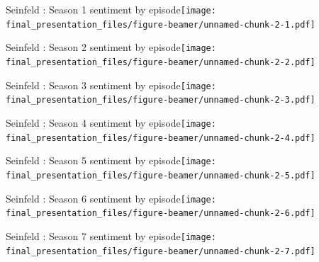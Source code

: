 \documentclass[
  ignorenonframetext,
]{beamer}
\begin{document}
\begin{frame}{Seinfeld : Season 1 sentiment by
episode\texttt{[image: final\_presentation\_files/figure-beamer/unnamed-chunk-2-1.pdf]}}
\protect\hypertarget{seinfeld-season-1-sentiment-by-episode}{}

\end{frame}

\begin{frame}{Seinfeld : Season 2 sentiment by
episode\texttt{[image: final\_presentation\_files/figure-beamer/unnamed-chunk-2-2.pdf]}}
\protect\hypertarget{seinfeld-season-2-sentiment-by-episode}{}

\end{frame}

\begin{frame}{Seinfeld : Season 3 sentiment by
episode\texttt{[image: final\_presentation\_files/figure-beamer/unnamed-chunk-2-3.pdf]}}
\protect\hypertarget{seinfeld-season-3-sentiment-by-episode}{}

\end{frame}

\begin{frame}{Seinfeld : Season 4 sentiment by
episode\texttt{[image: final\_presentation\_files/figure-beamer/unnamed-chunk-2-4.pdf]}}
\protect\hypertarget{seinfeld-season-4-sentiment-by-episode}{}

\end{frame}

\begin{frame}{Seinfeld : Season 5 sentiment by
episode\texttt{[image: final\_presentation\_files/figure-beamer/unnamed-chunk-2-5.pdf]}}
\protect\hypertarget{seinfeld-season-5-sentiment-by-episode}{}

\end{frame}

\begin{frame}{Seinfeld : Season 6 sentiment by
episode\texttt{[image: final\_presentation\_files/figure-beamer/unnamed-chunk-2-6.pdf]}}
\protect\hypertarget{seinfeld-season-6-sentiment-by-episode}{}

\end{frame}

\begin{frame}{Seinfeld : Season 7 sentiment by
episode\texttt{[image: final\_presentation\_files/figure-beamer/unnamed-chunk-2-7.pdf]}}
\protect\hypertarget{seinfeld-season-7-sentiment-by-episode}{}

\end{frame}
\end{document}
